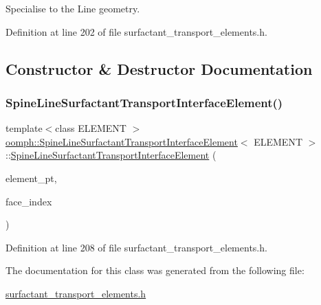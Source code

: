 Specialise to the Line geometry. 

Definition at line 202 of file surfactant\+\_\+transport\+\_\+elements.\+h.



\subsection{Constructor \& Destructor Documentation}
\mbox{\label{classoomph_1_1SpineLineSurfactantTransportInterfaceElement_a0b9ae72a734043e18ef9fc55629de3b6}} 
\subsubsection{\texorpdfstring{Spine\+Line\+Surfactant\+Transport\+Interface\+Element()}{SpineLineSurfactantTransportInterfaceElement()}}
{\footnotesize\ttfamily template$<$class E\+L\+E\+M\+E\+NT $>$ \\
\hyperlink{classoomph_1_1SpineLineSurfactantTransportInterfaceElement}{oomph\+::\+Spine\+Line\+Surfactant\+Transport\+Interface\+Element}$<$ E\+L\+E\+M\+E\+NT $>$\+::\hyperlink{classoomph_1_1SpineLineSurfactantTransportInterfaceElement}{Spine\+Line\+Surfactant\+Transport\+Interface\+Element} (\begin{DoxyParamCaption}\item[{Finite\+Element $\ast$const \&}]{element\+\_\+pt,  }\item[{const int \&}]{face\+\_\+index }\end{DoxyParamCaption})\hspace{0.3cm}{\ttfamily [inline]}}



Definition at line 208 of file surfactant\+\_\+transport\+\_\+elements.\+h.



The documentation for this class was generated from the following file\+:\begin{DoxyCompactItemize}
\item 
\hyperlink{surfactant__transport__elements_8h}{surfactant\+\_\+transport\+\_\+elements.\+h}\end{DoxyCompactItemize}

